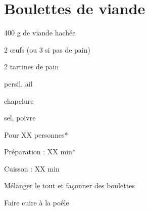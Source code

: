 \section{Boulettes de viande}

\begin{ingredients}
\item 400 g de viande hachée
\item 2 œufs (ou 3 si pas de pain)
\item 2 tartines de pain
\item persil, ail
\item chapelure
\item sel, poivre
\end{ingredients}
\begin{infos}
\item Pour XX personnes*		%
\item Préparation : XX min*		%
\item Cuisson : XX min			%
\end{infos}
\begin{etapes}
\item Mélanger le tout et façonner des boulettes
\item Faire cuire à la poêle
\end{etapes}
\begin{conseils}
\end{conseils}
